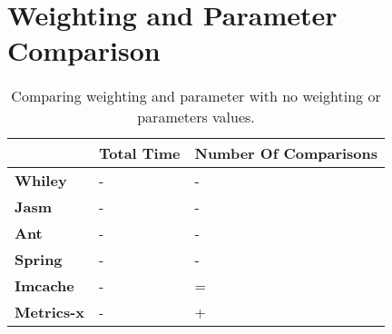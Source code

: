 \section{Weighting and Parameter Comparison}

\begin{table}[]
\centering
\caption{Comparing weighting and parameter with no weighting or parameters values.}
\label{my-label}
\begin{tabular}{|l|l|l|}
\hline
{\bf }          & {\bf Total Time} & {\bf Number Of Comparisons} \\ \hline
{\bf Whiley}    & -                & -                           \\ \hline
{\bf Jasm}      & -                & -                           \\ \hline
{\bf Ant}       & -                & -                           \\ \hline
{\bf Spring}    & -                & -                           \\ \hline
{\bf Imcache}   & -                & =                           \\ \hline
{\bf Metrics-x} & -                & +                           \\ \hline
\end{tabular}
\end{table}

